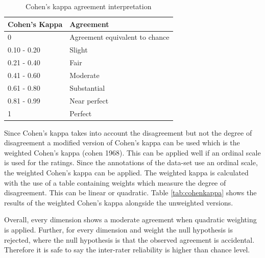 \begin{table}[]
\begin{tabular}{|p{3cm}|p{3cm}|}
\hline
\rowcolor[HTML]{EFEFEF} 
{\color[HTML]{41474D} Cohen's Kappa} & {\color[HTML]{41474D} Agreement}                      \\ \hline
{\color[HTML]{41474D} 0}                   & {\color[HTML]{41474D} Agreement equivalent to chance} \\ \hline
{\color[HTML]{41474D} 0.10 - 0.20}         & {\color[HTML]{41474D} Slight}                         \\ \hline
{\color[HTML]{41474D} 0.21 - 0.40}         & {\color[HTML]{41474D} Fair}                           \\ \hline
{\color[HTML]{41474D} 0.41 - 0.60}         & {\color[HTML]{41474D} Moderate}                       \\ \hline
{\color[HTML]{41474D} 0.61 - 0.80}         & {\color[HTML]{41474D} Substantial}                    \\ \hline
{\color[HTML]{41474D} 0.81 - 0.99}         & {\color[HTML]{41474D} Near perfect}                   \\ \hline
{\color[HTML]{41474D} 1}                   & {\color[HTML]{41474D} Perfect}                        \\ \hline
\end{tabular}
\caption{Cohen's kappa agreement interpretation}
\label{tab:cohenkappainterpret}
\end{table}

Since Cohen's kappa takes into account the disagreement but not the degree of disagreement a modified version of Cohen's kappa can be used which is the weighted Cohen's kappa (cohen 1968). This can be applied well if an ordinal scale is used for the ratings. Since the annotations of the data-set use an ordinal scale, the weighted Cohen's kappa can be applied. The weighted kappa is calculated with the use of a table containing weights which measure the degree of disagreement. This can be linear or quadratic. Table \ref{tab:cohenkappa} shows the results of the weighted Cohen's kappa alongside the unweighted versions. 

Overall, every dimension shows a moderate agreement when quadratic weighting is applied. Further, for every dimension and weight the null hypothesis is rejected, where the null hypothesis is that the observed agreement is accidental. Therefore it is safe to say the inter-rater reliability is higher than chance level. 

